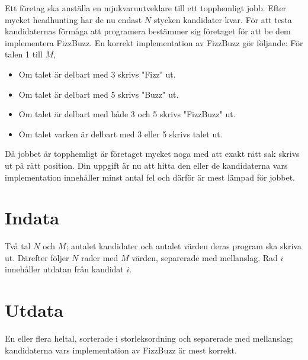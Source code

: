 Ett företag ska anställa en mjukvaruutveklare till ett topphemligt jobb. Efter mycket headhunting har de nu endast $N$ stycken kandidater kvar. För att testa kandidaternas förmåga att programera bestämmer sig företaget för att be dem implementera FizzBuzz.
En korrekt implementation av FizzBuzz gör följande:
För talen 1 till $M$,
\begin{itemize}
 \item Om talet är delbart med 3 skrivs "Fizz" ut.
 \item Om talet är delbart med 5 skrivs "Buzz" ut.
 \item Om talet är delbart med både 3 och 5 skrivs "FizzBuzz" ut. 
 \item Om talet varken är delbart med 3 eller 5 skrivs talet ut. 
\end{itemize}

Då jobbet är topphemligt är företaget mycket noga med att exakt rätt sak skrivs ut på rätt position. Din uppgift är nu att hitta den eller de kandidaterna vars implementation innehåller minst antal fel och därför är mest lämpad för jobbet.

\section*{Indata}
Två tal $N$ och $M$; antalet kandidater och antalet värden deras program ska skriva ut.
Därefter följer $N$ rader med $M$ värden, separerade med mellanslag. Rad $i$ innehåller utdatan från kandidat $i$.  

\section*{Utdata}
En eller flera heltal, sorterade i storleksordning och separerade med mellanslag; kandidaterna vars implementation av FizzBuzz är mest korrekt. 


